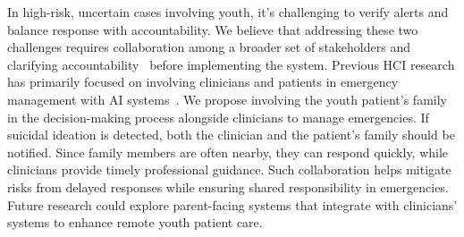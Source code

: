 In high-risk, uncertain cases involving youth, it’s challenging to verify alerts and balance response with accountability.
We believe that addressing these two challenges requires collaboration among a broader set of stakeholders and clarifying accountability~\cite{goodman2017european} before implementing the system. 
Previous HCI research has primarily focused on involving clinicians and patients in emergency management with AI systems~\cite{wu2024cardioai, hao2024advancing}. 
We propose involving the youth patient’s family in the decision-making process alongside clinicians to manage emergencies. 
If suicidal ideation is detected, both the clinician and the patient’s family should be notified. 
Since family members are often nearby, they can respond quickly, while clinicians provide timely professional guidance.
Such collaboration helps mitigate risks from delayed responses while ensuring shared responsibility in emergencies.
Future research could explore parent-facing systems that integrate with clinicians' systems to enhance remote youth patient care.
